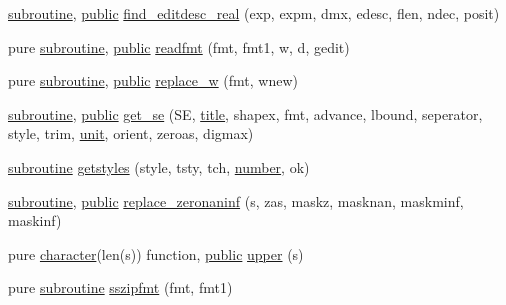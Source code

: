 \begin{DoxyCompactItemize}
\hyperlink{M__stopwatch_83_8txt_acfbcff50169d691ff02d4a123ed70482}{subroutine}, \hyperlink{M__stopwatch_83_8txt_a2f74811300c361e53b430611a7d1769f}{public} \hyperlink{namespacem__display__util_abcd2aebb4cd373005b4d1fc4359a2d01}{find\+\_\+editdesc\+\_\+real} (exp, expm, dmx, edesc, flen, ndec, posit)
\item 
pure \hyperlink{M__stopwatch_83_8txt_acfbcff50169d691ff02d4a123ed70482}{subroutine}, \hyperlink{M__stopwatch_83_8txt_a2f74811300c361e53b430611a7d1769f}{public} \hyperlink{namespacem__display__util_a73ae4e30d2dcf1f608ac24bf1623ee6c}{readfmt} (fmt, fmt1, w, d, gedit)
\item 
pure \hyperlink{M__stopwatch_83_8txt_acfbcff50169d691ff02d4a123ed70482}{subroutine}, \hyperlink{M__stopwatch_83_8txt_a2f74811300c361e53b430611a7d1769f}{public} \hyperlink{namespacem__display__util_a76a458454b83026c12d4a90882f2719e}{replace\+\_\+w} (fmt, wnew)
\item 
\hyperlink{M__stopwatch_83_8txt_acfbcff50169d691ff02d4a123ed70482}{subroutine}, \hyperlink{M__stopwatch_83_8txt_a2f74811300c361e53b430611a7d1769f}{public} \hyperlink{namespacem__display__util_a04585c4fe921b2423a6cfc1ad21a40b7}{get\+\_\+se} (SE, \hyperlink{print__watch_83_8txt_a15b5bd21156bb9fca6a755ab8c029a9c}{title}, shapex, fmt, advance, lbound, seperator, style, trim, \hyperlink{M__stopwatch_83_8txt_a5cbef30eb7c0d734bd82f5a7ebea9aa7}{unit}, orient, zeroas, digmax)
\item 
\hyperlink{M__stopwatch_83_8txt_acfbcff50169d691ff02d4a123ed70482}{subroutine} \hyperlink{namespacem__display__util_a692b7279b1883d8139b60e480aa1e430}{getstyles} (style, tsty, tch, \hyperlink{what__overview_81_8txt_a5168680dcac08de182f59de9a12c38ae}{number}, ok)
\item 
\hyperlink{M__stopwatch_83_8txt_acfbcff50169d691ff02d4a123ed70482}{subroutine}, \hyperlink{M__stopwatch_83_8txt_a2f74811300c361e53b430611a7d1769f}{public} \hyperlink{namespacem__display__util_a72816de72f8a35ed93223a4bfd650c9b}{replace\+\_\+zeronaninf} (s, zas, maskz, masknan, maskminf, maskinf)
\item 
pure \hyperlink{option__stopwatch_83_8txt_abd4b21fbbd175834027b5224bfe97e66}{character}(len(s)) function, \hyperlink{M__stopwatch_83_8txt_a2f74811300c361e53b430611a7d1769f}{public} \hyperlink{namespacem__display__util_a6a829115368f9e77c8b35fb1c86ac9c3}{upper} (s)
\item 
pure \hyperlink{M__stopwatch_83_8txt_acfbcff50169d691ff02d4a123ed70482}{subroutine} \hyperlink{namespacem__display__util_a3fa60429ffcc82a33032d718cbe03e87}{sszipfmt} (fmt, fmt1)

\end{DoxyCompactItemize}
